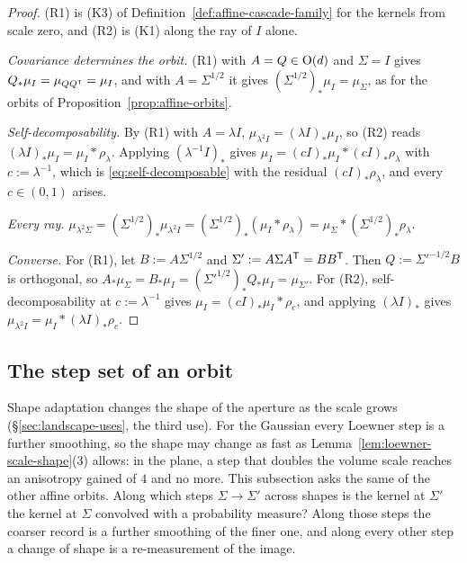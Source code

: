 \begin{proof}
(R1) is (K3) of Definition~\ref{def:affine-cascade-family} for the kernels from scale zero, and (R2)
is (K1) along the ray of $I$ alone.

\emph{Covariance determines the orbit.} (R1) with $A = Q \in \mathrm{O}(d)$ and $\Sigma = I$ gives
$Q_*\mu_I = \mu_{QQ^{\mathsf{T}}} = \mu_I$, and with $A = \Sigma^{1/2}$ it gives
$(\Sigma^{1/2})_*\mu_I = \mu_\Sigma$, as for the orbits of Proposition~\ref{prop:affine-orbits}.

\emph{Self-decomposability.} By (R1) with $A = \lambda I$, $\mu_{\lambda^2I} = (\lambda I)_*\mu_I$,
so (R2) reads $(\lambda I)_*\mu_I = \mu_I * \rho_\lambda$. Applying $(\lambda^{-1}I)_*$ gives
$\mu_I = (cI)_*\mu_I * (cI)_*\rho_\lambda$ with $c := \lambda^{-1}$, which is
\ref{eq:self-decomposable} with the residual $(cI)_*\rho_\lambda$, and every $c \in (0,1)$ arises.

\emph{Every ray.} $\mu_{\lambda^2\Sigma} = (\Sigma^{1/2})_*\mu_{\lambda^2I}
= (\Sigma^{1/2})_*(\mu_I * \rho_\lambda) = \mu_\Sigma * (\Sigma^{1/2})_*\rho_\lambda$.

\emph{Converse.} For (R1), let $B := A\Sigma^{1/2}$ and $\Sigma' := A\Sigma A^{\mathsf{T}} = BB^{\mathsf{T}}$. Then
$Q := \Sigma'^{-1/2}B$ is orthogonal, so
$A_*\mu_\Sigma = B_*\mu_I = (\Sigma'^{1/2})_*Q_*\mu_I = \mu_{\Sigma'}$. For (R2), self-decomposability
at $c := \lambda^{-1}$ gives $\mu_I = (cI)_*\mu_I * \rho_c$, and applying $(\lambda I)_*$ gives
$\mu_{\lambda^2I} = \mu_I * (\lambda I)_*\rho_c$.
\end{proof}

\subsection{The step set of an orbit}\label{sec:affine-stable-cone}

Shape adaptation changes the shape of the aperture as the scale grows (\S\ref{sec:landscape-uses}, the third use).
For the Gaussian every Loewner step is a further smoothing, so the shape may change as fast as
Lemma~\ref{lem:loewner-scale-shape}(3) allows: in the plane, a step that doubles the volume scale
reaches an anisotropy gained of $4$ and no more. This subsection asks the same of the other affine
orbits. Along which steps $\Sigma \to \Sigma'$ across shapes is the kernel at $\Sigma'$ the kernel at
$\Sigma$ convolved with a probability measure? Along those steps the coarser record is a further
smoothing of the finer one, and along every other step a change of shape is a re-measurement of the
image.


